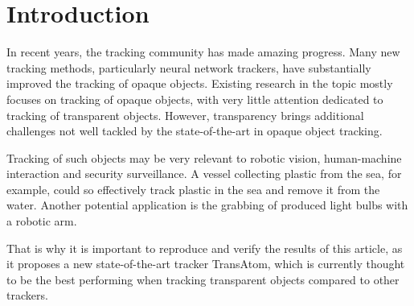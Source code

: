 \section{Introduction}
In recent years, the tracking community has made amazing progress. Many new tracking methods, particularly neural network trackers, have substantially improved the tracking of opaque objects. Existing research in the topic mostly focuses on tracking of opaque objects, with very little attention dedicated to tracking of transparent objects. However, transparency brings additional challenges not well tackled by the state-of-the-art in opaque object tracking.

Tracking of such objects may be very relevant to robotic vision, human-machine interaction and security surveillance. A vessel collecting plastic from the sea, for example, could so effectively track plastic in the sea and remove it from the water. Another potential application is the grabbing of produced light bulbs with a robotic arm.

That is why it is important to reproduce and verify the results of this article, as it proposes a new state-of-the-art tracker TransAtom, which is currently thought to be the best performing when tracking transparent objects compared to other trackers.